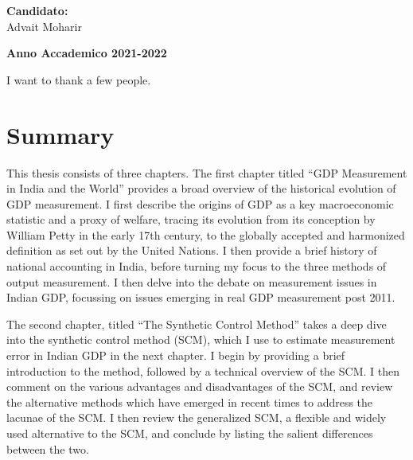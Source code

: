\documentclass[12pt,nobind, a4paper]{reedthesis}
\begin{document}
	\hfill
	\begin{minipage}[t]{0.47\textwidth}\raggedleft
		{\large{\textbf{Candidato:}\\
				Advait Moharir}}
	\end{minipage}
	\vspace{2mm} %
	\begin{center}
		{\large{\bf Anno Accademico 2021-2022}}
	\end{center}
	\frontmatter %
	\pagestyle{empty} %
		\begin{acknowledgements}
		I want to thank a few people.
	\end{acknowledgements}
		
		\hypersetup{linkcolor=blue}
	\setcounter{secnumdepth}{2}
	\setcounter{tocdepth}{2}
	\tableofcontents
		
		\listoftables
		
		\listoffigures
		
		
		
	\mainmatter %
	\pagestyle{fancyplain} %
	
	\hypertarget{summary}{%
 \chapter*{Summary}\label{summary}}

 This thesis consists of three chapters. The first chapter titled ``GDP Measurement in India and the World'' provides a broad overview of the historical evolution of GDP measurement. I first describe the origins of GDP as a key macroeconomic statistic and a proxy of welfare, tracing its evolution from its conception by William Petty in the early 17th century, to the globally accepted and harmonized definition as set out by the United Nations. I then provide a brief history of national accounting in India, before turning my focus to the three methods of output measurement. I then delve into the debate on measurement issues in Indian GDP, focussing on issues emerging in real GDP measurement post 2011. \linebreak

 The second chapter, titled ``The Synthetic Control Method'' takes a deep dive into the synthetic control method (SCM), which I use to estimate measurement error in Indian GDP in the next chapter. I begin by providing a brief introduction to the method, followed by a technical overview of the SCM. I then comment on the various advantages and disadvantages of the SCM, and review the alternative methods which have emerged in recent times to address the lacunae of the SCM. I then review the generalized SCM, a flexible and widely used alternative to the SCM, and conclude by listing the salient differences between the two. \linebreak
\end{document}
